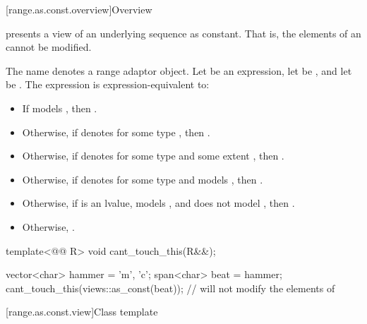[range.as.const.overview]{Overview}

\pnum
{} presents a view of an underlying sequence as constant.
That is, the elements of an  cannot be modified.

\pnum
The name  denotes
a range adaptor object.
Let  be an expression,
let  be , and
let  be .
The expression  is expression-equivalent to:
\begin{itemize}
\item
If  models ,
then .
\item
Otherwise,
if  denotes 
for some type , then .
\item
Otherwise,
if  denotes 
for some type  and some extent ,
then .
\item
Otherwise,
if  denotes  for some type  and
 models ,
then .
\item
Otherwise,
if  is an lvalue,
 models , and
 does not model ,
then .
\item
Otherwise, .
\end{itemize}

\pnum
\begin{example}
\begin{codeblock}
template<@@ R>
void cant_touch_this(R&&);

vector<char> hammer = {'m', 'c'};
span<char> beat = hammer;
cant_touch_this(views::as_const(beat));         // will not modify the elements of 
\end{codeblock}
\end{example}

[range.as.const.view]{Class template }

